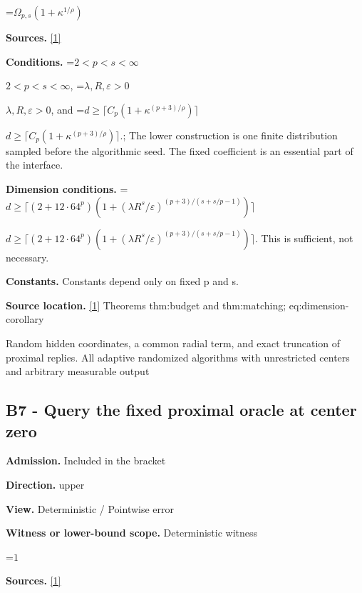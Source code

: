 \documentclass[10pt,a4paper]{article}
\newcommand{\AtlasMath}[1]{\par\begingroup\centering\setbox0=\hbox{$\displaystyle #1$}\ifdim\wd0>1.4\linewidth\typeout{ATLAS WIDE FORMULA: \the\wd0}\fi\ifdim\wd0>\linewidth\resizebox{\linewidth}{!}{\box0}\else\box0\fi\par\endgroup}
\newcommand{\AtlasInlineMath}[1]{\begingroup\setbox0=\hbox{$#1$}\ifdim\wd0>.4\linewidth\endgroup\AtlasMath{#1}\else\endgroup$#1$\fi}
\begin{document}
\AtlasMath{\Omega_{p,s}(1+\kappa^{1/\rho})}


\textbf{Sources.} \href{https://github.com/WU-Wendao/Colombo/blob/main/colombo_sensorium/Complexity_altas/data/sources/colombo/B2/manuscript.pdf}{[1]}



\textbf{Conditions.} \AtlasInlineMath{2<p<s<\infty}, \AtlasInlineMath{\lambda,R,\varepsilon>0}, and \AtlasInlineMath{d\ge\lceil C_p(1+\kappa^{(p+3)/\rho})\rceil}.; The lower construction is one finite distribution sampled before the algorithmic seed. The fixed coefficient is an essential part of the interface.



\textbf{Dimension conditions.} \AtlasInlineMath{d\ge\lceil(2+12\cdot64^p)(1+(\lambda R^s/\varepsilon)^{(p+3)/(s+s/p-1)})\rceil}. This is sufficient, not necessary.



\textbf{Constants.} Constants depend only on fixed p and s.



\textbf{Source location.} \href{https://github.com/WU-Wendao/Colombo/blob/main/colombo_sensorium/Complexity_altas/data/sources/colombo/B2/manuscript.pdf}{[1]} Theorems thm:budget and thm:matching; eq:dimension-corollary



Random hidden coordinates, a common radial term, and exact truncation of proximal replies. All adaptive randomized algorithms with unrestricted centers and arbitrary measurable output



\subsection{B7 - Query the fixed proximal oracle at center zero}


\textbf{Admission.} Included in the bracket



\textbf{Direction.} upper



\textbf{View.} Deterministic / Pointwise error



\textbf{Witness or lower-bound scope.} Deterministic witness



\AtlasMath{1}


\textbf{Sources.} \href{https://github.com/WU-Wendao/Colombo/blob/main/colombo_sensorium/Complexity_altas/data/sources/colombo/B2/manuscript.pdf}{[1]}
\end{document}
